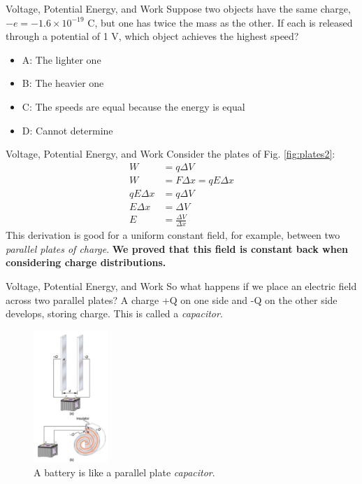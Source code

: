 \documentclass{beamer}
\begin{document}
\begin{frame}{Voltage, Potential Energy, and Work}
Suppose two objects have the same charge, $-e = -1.6\times 10^{-19}$ C, but one has twice the mass as the other.  If each is released through a potential of 1 V, which object achieves the highest speed?
\begin{itemize}
\item A: The lighter one
\item B: The heavier one
\item C: The speeds are equal because the energy is equal
\item D: Cannot determine
\end{itemize}
\end{frame}

\begin{frame}{Voltage, Potential Energy, and Work}
Consider the plates of Fig. \ref{fig:plates2}:
\begin{align}
W &= q\Delta V \\
W &= F\Delta x = qE \Delta x \\
qE \Delta x &= q\Delta V \\
E \Delta x &= \Delta V \\
E &= \frac{\Delta V}{\Delta x}
\end{align}
This derivation is good for a uniform constant field, for example, between two \textit{parallel plates of charge}.  \textbf{We proved that this field is constant back when considering charge distributions.}
\end{frame}

\begin{frame}{Voltage, Potential Energy, and Work}
So what happens if we place an electric field across two parallel plates? A charge +Q on one side and -Q on the other side develops, storing charge.  This is called a \textit{capacitor}.
\begin{figure}
\centering
\includegraphics[width=0.25\textwidth]{figures/batt.png}
\caption{\label{fig:batt} A battery is like a parallel plate \textit{capacitor}.}
\end{figure}
\end{frame}
\end{document}
